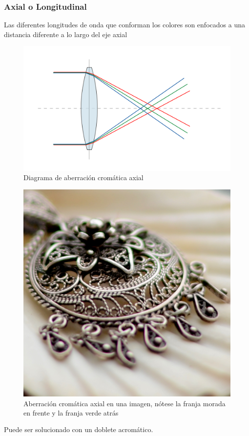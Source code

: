 \documentclass{article}
\begin{document}
\subsubsection{Axial o Longitudinal}

Las diferentes longitudes de onda que conforman los colores son enfocados a una distancia diferente a lo largo del eje axial

\begin{figure}[H]
	\centering
	\includegraphics[width=0.70\linewidth]{Figuras/Axial_Aberration}
	\caption{Diagrama de aberración cromática axial}
	\label{fig:axialaberration}
\end{figure}

\begin{figure}[H]
	\centering
	\includegraphics[width=0.65\linewidth]{Figuras/Axial_Aberration_2}
	\caption{Aberración cromática axial en una imagen, nótese la franja morada en frente y la franja verde atrás}
	\label{fig:axialaberration2}
\end{figure}

Puede ser solucionado con un doblete acromático.
\end{document}
